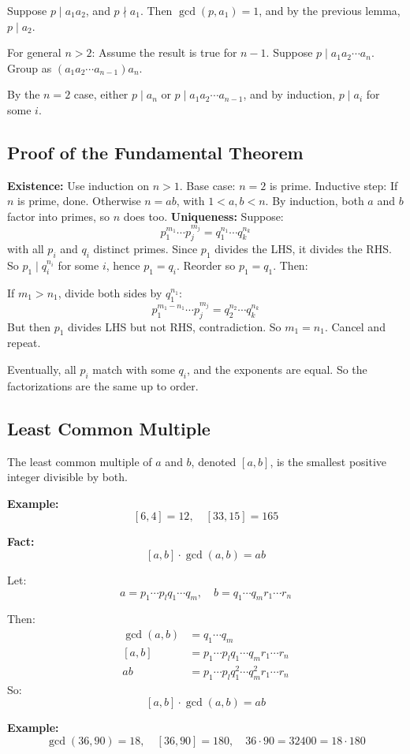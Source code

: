 Suppose \(p \mid a_1a_2\), and \(p \nmid a_1\).
Then \(\gcd(p, a_1) = 1\), and by the previous lemma, \(p \mid a_2\).

For general \(n > 2\): Assume the result is true for \(n-1\). Suppose \(p \mid a_1a_2 \cdots a_n\).
Group as \((a_1a_2 \cdots a_{n-1})a_n\).

By the \(n=2\) case, either \(p \mid a_n\) or \(p \mid a_1a_2 \cdots a_{n-1}\), and by induction, \(p \mid a_i\) for some \(i\).

\QED

\subsection{Proof of the Fundamental Theorem}

\textbf{Existence:}
\newline
Use induction on \(n > 1\).
Base case: \(n = 2\) is prime.
\newline
Inductive step: If \(n\) is prime, done. Otherwise \(n = ab\), with \(1 < a, b < n\).
By induction, both \(a\) and \(b\) factor into primes, so \(n\) does too.
\newline
\textbf{Uniqueness:}
\newline
Suppose:
\[
	p_1^{m_1} \cdots p_j^{m_j} = q_1^{n_1} \cdots q_k^{n_k}
\]
with all \(p_i\) and \(q_i\) distinct primes.
\newline
Since \(p_1\) divides the LHS, it divides the RHS. So \(p_1 \mid q_i^{n_i}\) for some \(i\), hence \(p_1 = q_i\).
Reorder so \(p_1 = q_1\). Then:

If \(m_1 > n_1\), divide both sides by \(q_1^{n_1}\):
\[
	p_1^{m_1-n_1} \cdots p_j^{m_j} = q_2^{n_2} \cdots q_k^{n_k}
\]
But then \(p_1\) divides LHS but not RHS, contradiction. So \(m_1 = n_1\). Cancel and repeat.

Eventually, all \(p_i\) match with some \(q_i\), and the exponents are equal. So the factorizations are the same up to order.

\QED

\subsection{Least Common Multiple}

The least common multiple of \(a\) and \(b\), denoted \([a, b]\), is the smallest positive integer divisible by both.

\textbf{Example:}
\[
	[6, 4] = 12, \quad [33, 15] = 165
\]

\textbf{Fact:}
\[
	[a, b] \cdot \gcd(a, b) = ab
\]

Let:
\[
	a = p_1 \cdots p_lq_1 \cdots q_m, \quad b = q_1 \cdots q_mr_1 \cdots r_n
\]

Then:
\begin{align*}
	\gcd(a, b) & = q_1 \cdots q_m                                 \\
	[a, b]     & = p_1 \cdots p_lq_1 \cdots q_mr_1 \cdots r_n     \\
	ab         & = p_1 \cdots p_lq_1^2 \cdots q_m^2r_1 \cdots r_n
\end{align*}
So:
\[
	[a, b] \cdot \gcd(a, b) = ab
\]

\textbf{Example:}
\[
	\gcd(36, 90) = 18, \quad [36, 90] = 180, \quad 36 \cdot 90 = 32400 = 18 \cdot 180
\]
